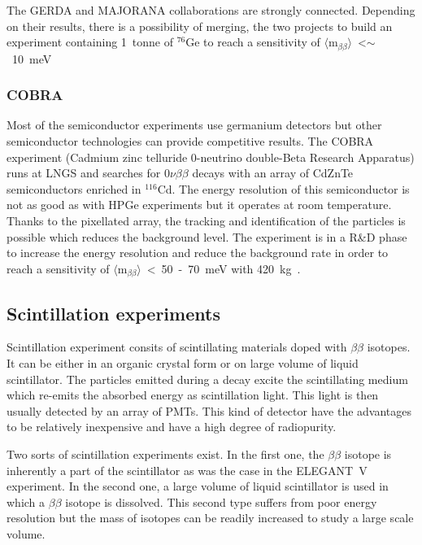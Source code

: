\documentclass[main.tex]{subfiles}
\begin{document}
\bigskip


\NI The GERDA and MAJORANA collaborations are strongly connected. Depending on their results, there is a possibility of merging, the two projects to build an experiment containing 1~tonne of $^{\text{76}}$Ge to reach a sensitivity of $\langle \text{m}_{\beta\beta} \rangle$~<$\sim$~10~meV~\cite{MAJORANAandGERDA} \\

\subsubsection{COBRA}


\NI Most of the semiconductor experiments use germanium detectors but other semiconductor technologies can provide competitive results. The COBRA experiment (Cadmium zinc telluride 0-neutrino double-Beta Research Apparatus) runs at LNGS and searches for 0$\nu\beta\beta$ decays with an array of CdZnTe semiconductors enriched in $^{\text{116}}$Cd. The energy resolution of this semiconductor is not as good as with HPGe experiments but it operates at room temperature. Thanks to the pixellated array, the tracking and identification of the particles is possible which reduces the background level. The experiment is in a R\&D phase to increase the energy resolution and reduce the background rate in order to reach a sensitivity of $\langle \text{m}_{\beta\beta} \rangle$~<~50~-~70~meV with 420~kg~\cite{COBRA}.


\subsection{Scintillation experiments}


\NI Scintillation experiment consits of scintillating materials doped with $\beta\beta$ isotopes. It can be either in an organic crystal form or on large volume of liquid scintillator. The particles emitted during a decay excite the scintillating medium which re-emits the absorbed energy as scintillation light. This light is then usually detected by an array of PMTs. This kind of detector have the advantages to be relatively inexpensive and have a high degree of radiopurity. 


\bigskip


\NI Two sorts of scintillation experiments exist. In the first one, the $\beta\beta$ isotope is inherently a part of the scintillator as was the case in the ELEGANT~V experiment. In the second one, a large volume of liquid scintillator is used in which a $\beta\beta$ isotope is dissolved. This second type suffers from poor energy resolution but the mass of isotopes can be readily increased to study a large scale volume.
\end{document}
